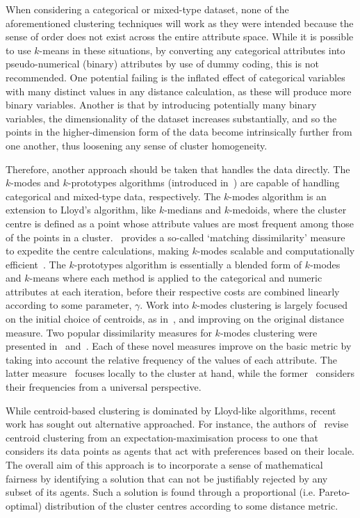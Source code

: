 When considering a categorical or mixed-type dataset, none of the aforementioned
clustering techniques will work as they were intended because the sense of order
does not exist across the entire attribute space. While it is possible to use
\(k\)-means in these situations, by converting any categorical attributes into
pseudo-numerical (binary) attributes by use of dummy coding, this is not
recommended. One potential failing is the inflated effect of categorical
variables with many distinct values in any distance calculation, as these will
produce more binary variables. Another is that by introducing potentially many
binary variables, the dimensionality of the dataset increases substantially, and
so the points in the higher-dimension form of the data become intrinsically
further from one another, thus loosening any sense of cluster homogeneity.

Therefore, another approach should be taken that handles the data directly. The
\(k\)-modes and \(k\)-prototypes algorithms (introduced in~\cite{Huang1998}) are
capable of handling categorical and mixed-type data, respectively. The
\(k\)-modes algorithm is an extension to Lloyd's algorithm, like \(k\)-medians
and \(k\)-medoids, where the cluster centre is defined as a point whose
attribute values are most frequent among those of the points in a
cluster.~\cite{Huang1998} provides a so-called `matching dissimilarity' measure
to expedite the centre calculations, making \(k\)-modes scalable and
computationally efficient~\cite{Madhuri2014}. The \(k\)-prototypes algorithm is
essentially a blended form of \(k\)-modes and \(k\)-means where each method is
applied to the categorical and numeric attributes at each iteration, before
their respective costs are combined linearly according to some parameter,
\(\gamma\). Work into \(k\)-modes clustering is largely focused on the initial
choice of centroids, as
in~\cite{Cao2009,Jiang2016,Khan2013,Khan2007,Taoying2013,Wilde2020}, and
improving on the original distance measure. Two popular dissimilarity measures
for \(k\)-modes clustering were presented in~\cite{Cao2012} and~\cite{Ng2007}.
Each of these novel measures improve on the basic metric by taking into account
the relative frequency of the values of each attribute. The latter
measure~\cite{Ng2007} focuses locally to the cluster at hand, while the
former~\cite{Cao2012} considers their frequencies from a universal perspective.

While centroid-based clustering is dominated by Lloyd-like algorithms, recent
work has sought out alternative approached. For instance, the authors
of~\cite{Chen2019} revise centroid clustering from an expectation-maximisation
process to one that considers its data points as agents that act with
preferences based on their locale. The overall aim of this approach is to
incorporate a sense of mathematical fairness by identifying a solution that can
not be justifiably rejected by any subset of its agents. Such a solution is
found through a proportional (i.e. Pareto-optimal) distribution of the cluster
centres according to some distance metric.

